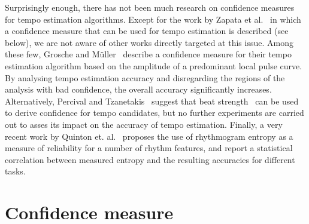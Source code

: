 \documentclass{article}
\begin{document}
Surprisingly enough, there has not been much research on confidence measures for tempo estimation algorithms.
Except for the work by Zapata et al.~\cite{Zapata2012} in which a confidence measure that can be used for tempo estimation is described (see below), we are not aware of other works directly targeted at this issue. 
Among these few, Grosche and M\"{u}ller~\cite{Grosche2010} describe a confidence measure for their tempo estimation algorithm based on the amplitude of a predominant local pulse curve. 
By analysing tempo estimation accuracy and disregarding the regions of the analysis with bad confidence, the overall accuracy significantly increases. 
Alternatively, Percival and Tzanetakis~\cite{Percival2014} suggest that beat strength~\cite{Tzanetakis2002} can be used to derive confidence for tempo candidates, but no further experiments are carried out to asses its impact on the accuracy of tempo estimation.
Finally, a very recent work by Quinton et. al.~\cite{Quinton2016} proposes the use of rhythmogram entropy as a measure of  reliability for a number of rhythm features, and report a statistical correlation between measured entropy and the resulting accuracies for different tasks.

\section{Confidence measure}\label{sec:confidence_measure}
\end{document}
